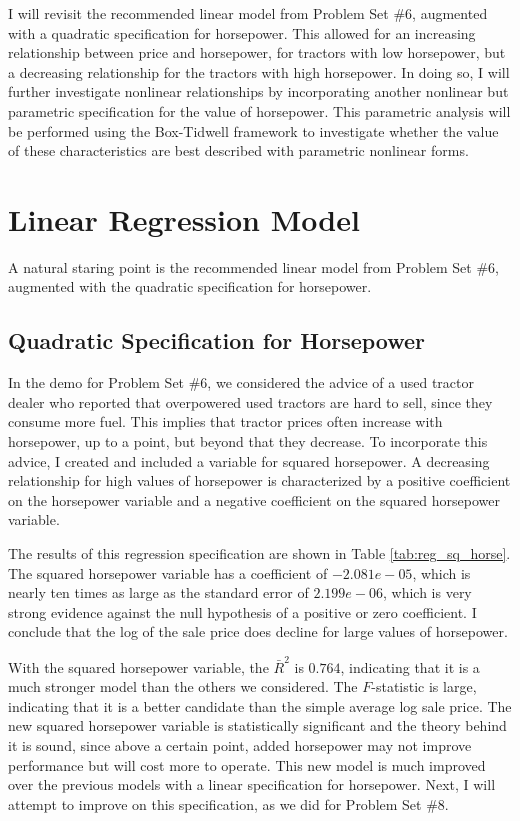 \documentclass[11pt]{paper}
\begin{document}
I will revisit the recommended linear model
from Problem Set \#6, 
augmented with a quadratic specification for horsepower.
This allowed for an increasing relationship 
between price and horsepower, 
for tractors with low horsepower, 
but a decreasing relationship for the tractors with high horsepower. 
%
In doing so, I will further investigate nonlinear relationships
by incorporating another nonlinear but parametric specification
for the value of horsepower. 
This parametric analysis will be performed
using the Box-Tidwell framework
to investigate whether the value of these characteristics
are best described with parametric nonlinear forms. 

\clearpage
\section{Linear Regression Model}

A natural staring point is the recommended linear model
from Problem Set \#6, augmented with 
the quadratic specification for horsepower. 

\subsection{Quadratic Specification for Horsepower}

In the demo for Problem Set \#6, 
we considered the advice of
a used tractor dealer who reported that overpowered used tractors are hard to sell, since they consume more fuel. 
This implies that tractor prices often increase with horsepower, up to a point, but beyond that they decrease. 
To incorporate this advice, I created and included a variable for squared horsepower. 
A decreasing relationship for high values of horsepower
is characterized by 
a positive coefficient on the horsepower variable and
a negative coefficient on the squared horsepower variable. 

% 

% 
The results of this regression specification are shown in 
Table \ref{tab:reg_sq_horse}. 
%
The squared horsepower variable has a coefficient of $-2.081e-05$, which is nearly ten times as large as the standard error of $2.199e-06$, which is very strong evidence against the null hypothesis of a positive or zero coefficient. 
I conclude that the log of the sale price does decline for large values of horsepower. 


With the squared horsepower variable, the $\bar{R}^2$ is $0.764$, indicating that it is a much stronger model than the others we considered. 
The $F$-statistic is large, indicating that it is a better candidate than the simple average log sale price. 
The new squared horsepower variable is statistically significant and the theory behind it is sound, since above a certain point, added horsepower may not improve performance but will cost more to operate. 
This new model is much improved over the previous models with a linear specification for horsepower.
Next, I will attempt to improve on this specification, 
as we did for Problem Set \#8. 
\end{document}
